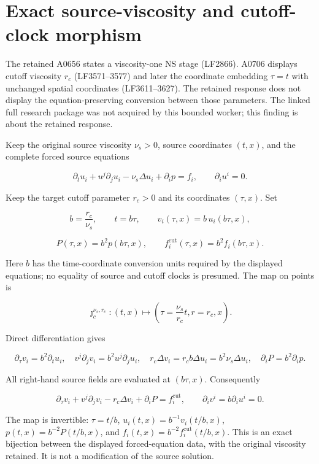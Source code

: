\section{Exact source-viscosity and cutoff-clock
morphism}\label{TranscriptStage:proof11:exact-source-viscosity-and-cutoff-clock-morphism}

The retained A0656 states a viscosity-one NS stage (LF2866). A0706
displays cutoff viscosity \(r_c\) (LF3571--3577) and later the
coordinate embedding \(\tau=t\) with unchanged spatial coordinates
(LF3611--3627). The retained response does not display the
equation-preserving conversion between those parameters. The linked full
research package was not acquired by this bounded worker; this finding
is about the retained response.

Keep the original source viscosity \(\nu_s>0\), source coordinates
\((t,x)\), and the complete forced source equations

\[
\partial_tu_i+u^j\partial_ju_i-\nu_s\Delta u_i+\partial_ip=f_i,
\qquad \partial_iu^i=0.
\]

Keep the target cutoff parameter \(r_c>0\) and its coordinates
\((\tau,x)\). Set

\[
b=\frac{r_c}{\nu_s},\qquad
t=b\tau,
\qquad v_i(\tau,x)=b\,u_i(b\tau,x),
\]

\[
P(\tau,x)=b^2p(b\tau,x),
\qquad f_i^{\mathrm{cut}}(\tau,x)=b^2f_i(b\tau,x).
\]

Here \(b\) has the time-coordinate conversion units required by the
displayed equations; no equality of source and cutoff clocks is
presumed. The map on points is

\[
\jmath_c^{\nu_s,r_c}:(t,x)\longmapsto
\left(\tau=\frac{\nu_s}{r_c}t,r=r_c,x\right).
\]

Direct differentiation gives

\[
\partial_\tau v_i=b^2\partial_tu_i,
\quad v^j\partial_jv_i=b^2u^j\partial_ju_i,
\quad r_c\Delta v_i=r_cb\Delta u_i=b^2\nu_s\Delta u_i,
\quad \partial_iP=b^2\partial_ip.
\]

All right-hand source fields are evaluated at \((b\tau,x)\).
Consequently

\[
\partial_\tau v_i+v^j\partial_jv_i-r_c\Delta v_i+\partial_iP
=f_i^{\mathrm{cut}},
\qquad \partial_iv^i=b\partial_iu^i=0.
\]

The map is invertible: \(\tau=t/b\), \(u_i(t,x)=b^{-1}v_i(t/b,x)\),
\(p(t,x)=b^{-2}P(t/b,x)\), and
\(f_i(t,x)=b^{-2}f_i^{\mathrm{cut}}(t/b,x)\). This is an exact bijection
between the displayed forced-equation data, with the original viscosity
retained. It is not a modification of the source solution.

